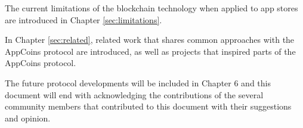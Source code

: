 \medskip

The current limitations of the blockchain technology when applied to app stores are introduced in Chapter \ref{sec:limitations}.

\medskip

In Chapter \ref{sec:related}, related work that shares common approaches with the AppCoins protocol are introduced, as well as projects that inspired parts of the AppCoins protocol.

\medskip

The future protocol developments will be included in Chapter 6 and this document will end with acknowledging the contributions of the several community members that contributed to this document with their suggestions and opinion.



